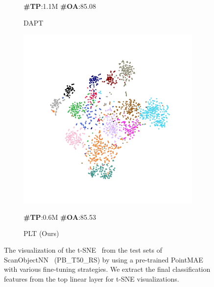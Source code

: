 \begin{figure}
\begin{subfigure}{0.19\textwidth}
        \caption*{\textbf{\#TP}:1.1M \textbf{\#OA}:85.08}
        \caption{DAPT}
        \label{fig:sub4}
    \end{subfigure}
    \hfill
    \begin{subfigure}{0.19\textwidth}
        \centering
        \includegraphics[width=\linewidth]{fig/tsne/point_ladder.pdf}
        \caption*{\textbf{\#TP}:0.6M \textbf{\#OA}:85.53}
        \caption{PLT (Ours)}
        \label{fig:sub8}
    \end{subfigure}
    \caption{The visualization of the t-SNE~\cite{van2008visualizing} from the test sets of ScanObjectNN~\cite{uy2019revisiting} (PB\_T50\_RS) by using a pre-trained PointMAE~\cite{pang2022masked} with various fine-tuning strategies. We extract the final classification features from the top linear layer for t-SNE visualizations.}
    \label{fig:tsne}
\end{figure}